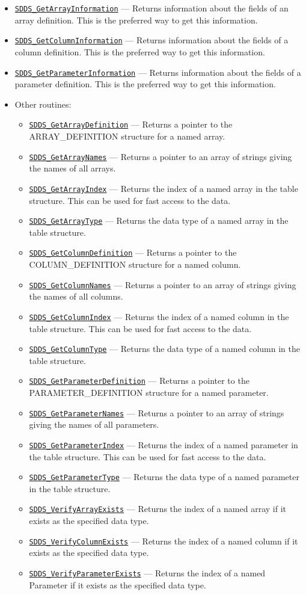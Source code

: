 \documentclass[11pt]{article}
\newcommand{\progref}[1]{\hyperref[SDDS_#1]{\tt SDDS\_#1}}
\begin{document}
\begin{itemize}
\item \progref{GetArrayInformation} --- Returns information about the fields of an array definition. This is the preferred way to get this information.
\item \progref{GetColumnInformation} --- Returns information about the fields of a column definition. This is the preferred way to get this information.
\item \progref{GetParameterInformation} --- Returns information about the fields of a parameter definition. This is the preferred way to get this information.
\item Other routines:
\begin{itemize}
\item \progref{GetArrayDefinition} --- Returns a pointer to the ARRAY\_DEFINITION structure for a named array.
\item \progref{GetArrayNames} --- Returns a pointer to an array of strings giving the names of all arrays.
\item \progref{GetArrayIndex} --- Returns the index of a named array in the table structure. This can be used for fast access to the data.
\item \progref{GetArrayType} --- Returns the data type of a named array in the table structure.
\item \progref{GetColumnDefinition} --- Returns a pointer to the COLUMN\_DEFINITION structure for a named column.
\item \progref{GetColumnNames} --- Returns a pointer to an array of strings giving the names of all columns.
\item \progref{GetColumnIndex} --- Returns the index of a named column in the table structure. This can be used for fast access to the data.
\item \progref{GetColumnType} --- Returns the data type of a named column in the table structure.
\item \progref{GetParameterDefinition} --- Returns a pointer to the PARAMETER\_DEFINITION structure for a named parameter.
\item \progref{GetParameterNames} --- Returns a pointer to an array of strings giving the names of all parameters.
\item \progref{GetParameterIndex} --- Returns the index of a named parameter in the table structure. This can be used for fast access to the data.
\item \progref{GetParameterType} --- Returns the data type of a named parameter in the table structure.
\item \progref{VerifyArrayExists} --- Returns the index of a named array if it exists as the specified data type.
\item \progref{VerifyColumnExists} --- Returns the index of a named column if it exists as the specified data type.
\item \progref{VerifyParameterExists} --- Returns the index of a named Parameter if it exists as the specified data type.
\end{itemize}
\end{itemize}
\end{document}
